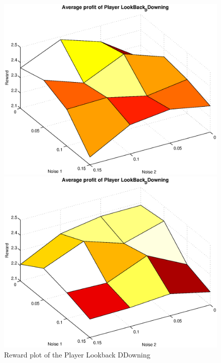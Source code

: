 \documentclass[11pt,twoside]{article}
\begin{document}
\begin{figure}[h]

\begin{minipage}[hbt]{0.65\textwidth}
	\centering
	\includegraphics[width=\textwidth]{pics/simulation1/Reward_vs_Noise_of_Player_LookBack_DDowning}
\end{minipage}
\hfill
\begin{minipage}[hbt]{0.3\textwidth}
	\centering
	\includegraphics[width=\textwidth]{pics/simulation2/Reward_vs_Noise_of_Player_LookBack_DDowning}
\end{minipage}
	\caption{Reward plot of the Player Lookback DDowning}
	\label{pic player lbdd}
\end{figure}
\end{document}
